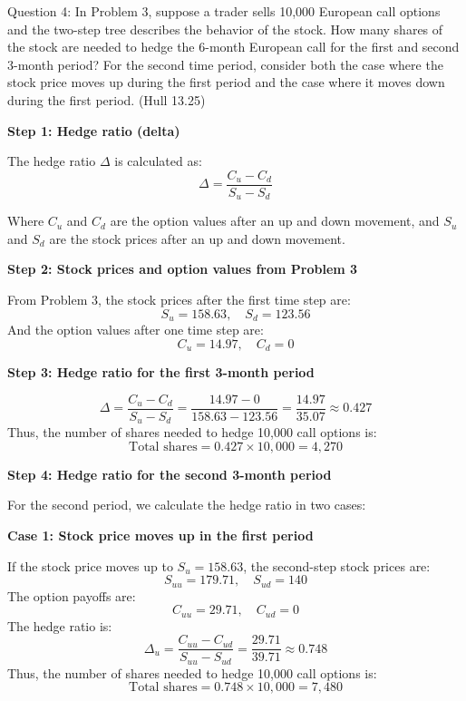 \documentclass[12pt,letterpaper, onecolumn]{exam}
\begin{document}
\newpage

\begin{question}{Question 4:}
In Problem 3, suppose a trader sells 10,000 European call options and the two-step tree describes the behavior of the stock. How many shares of the stock are needed to hedge the 6-month European call for the first and second 3-month period? For the second time period, consider both the case where the stock price moves up during the first period and the case where it moves down during the first period. (Hull 13.25)
\end{question}

\begin{solution}

\textbf{Step 1: Hedge ratio (delta)}

The hedge ratio \( \Delta \) is calculated as:
\[
\Delta = \frac{C_u - C_d}{S_u - S_d}
\]

Where \( C_u \) and \( C_d \) are the option values after an up and down movement, and \( S_u \) and \( S_d \) are the stock prices after an up and down movement.

\textbf{Step 2: Stock prices and option values from Problem 3}

From Problem 3, the stock prices after the first time step are:
\[
S_u = 158.63, \quad S_d = 123.56
\]
And the option values after one time step are:
\[
C_u = 14.97, \quad C_d = 0
\]

\textbf{Step 3: Hedge ratio for the first 3-month period}

\[
\Delta = \frac{C_u - C_d}{S_u - S_d} = \frac{14.97 - 0}{158.63 - 123.56} = \frac{14.97}{35.07} \approx 0.427
\]
Thus, the number of shares needed to hedge 10,000 call options is:
\[
\text{Total shares} = 0.427 \times 10,000 = 4,270
\]

\textbf{Step 4: Hedge ratio for the second 3-month period}

For the second period, we calculate the hedge ratio in two cases:

\textbf{Case 1: Stock price moves up in the first period}

If the stock price moves up to \( S_u = 158.63 \), the second-step stock prices are:
\[
S_{uu} = 179.71, \quad S_{ud} = 140
\]
The option payoffs are:
\[
C_{uu} = 29.71, \quad C_{ud} = 0
\]
The hedge ratio is:
\[
\Delta_u = \frac{C_{uu} - C_{ud}}{S_{uu} - S_{ud}} = \frac{29.71}{39.71} \approx 0.748
\]
Thus, the number of shares needed to hedge 10,000 call options is:
\[
\text{Total shares} = 0.748 \times 10,000 = 7,480
\]


\end{solution}
\end{document}
